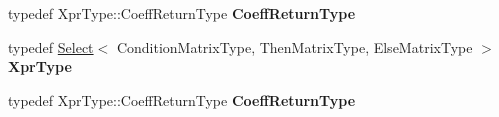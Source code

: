 \begin{DoxyCompactItemize}
typedef Xpr\+Type\+::\+Coeff\+Return\+Type {\bfseries Coeff\+Return\+Type}
\item 
\mbox{\label{struct_eigen_1_1internal_1_1evaluator_3_01_select_3_01_condition_matrix_type_00_01_then_matrix_t0c555ecce04e199df0b1ebada3749ccc_a78436c5edc9cca577b62054c11c57e19}} 
typedef \hyperlink{group___core___module_class_eigen_1_1_select}{Select}$<$ Condition\+Matrix\+Type, Then\+Matrix\+Type, Else\+Matrix\+Type $>$ {\bfseries Xpr\+Type}
\item 
\mbox{\label{struct_eigen_1_1internal_1_1evaluator_3_01_select_3_01_condition_matrix_type_00_01_then_matrix_t0c555ecce04e199df0b1ebada3749ccc_a94a05fa6ddffcd5bd61ee55940770ebc}} 
typedef Xpr\+Type\+::\+Coeff\+Return\+Type {\bfseries Coeff\+Return\+Type}
\end{DoxyCompactItemize}
